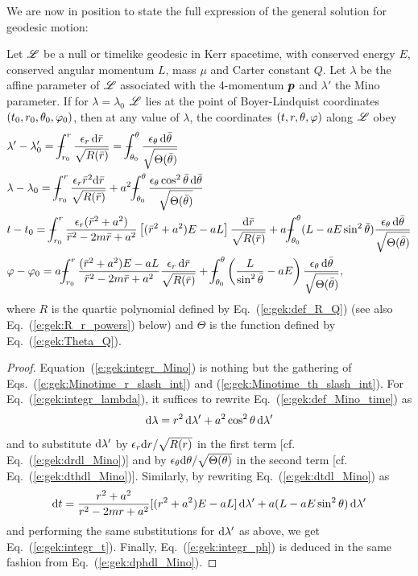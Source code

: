 We are now in position to state the full expression of the general
solution for geodesic motion:
\begin{greybox}
Let $\mathscr{L}$ be a null or timelike geodesic in Kerr spacetime,
with conserved energy $E$, conserved angular momentum $L$, mass $\mu$ and
Carter constant $Q$. Let $\lambda$ be the affine parameter of $\mathscr{L}$
associated with the 4-momentum $\bm{p}$ and $\lambda'$ the
Mino parameter. If for $\lambda=\lambda_0$
$\mathscr{L}$ lies at the point of Boyer-Lindquist coordinates $(t_0,r_0,\theta_0,\varphi_0)$,
then at any value of $\lambda$, the coordinates $(t,r,\theta,\varphi)$ along $\mathscr{L}$
obey
\begin{subequations}
\label{e:gek:integrated_eqs}
\begin{align}
 & \lambda' - \lambda'_0 = \dashint_{r_0}^r \frac{\eps_r \, \D \bar{r}}{\sqrt{R(\bar{r})}}
   = \dashint_{\th_0}^\th \frac{\eps_\th \, \D \bar{\th}}{\sqrt{\Theta(\bar{\th})}}
    \label{e:gek:integr_Mino}\\
 & \lambda - \lambda_0 = \dashint_{r_0}^r \frac{\eps_r \bar{r}^2 \D \bar{r}}{\sqrt{R(\bar{r})}}
    + a^2 \dashint_{\th_0}^\th \frac{\eps_\th \cos^2\bar{\th} \, \D \bar{\th}}{\sqrt{\Theta(\bar{\th})}}
    \label{e:gek:integr_lambda} \\
 & t - t_0 = \dashint_{r_0}^r  \frac{\eps_r (\bar{r}^2 + a^2)}{\bar{r}^2 - 2m \bar{r} + a^2}
 \left[ (\bar{r}^2 + a^2) E - a L \right] \frac{\D \bar{r}}{\sqrt{R(\bar{r})}}
 + a \dashint_{\th_0}^\th ( L - a E \sin^2\bar{\th} ) \frac{\eps_\th \, \D \bar{\th}}{\sqrt{\Theta(\bar{\th})}} \label{e:gek:integr_t} \\
 & \ph - \ph_0 = a \dashint_{r_0}^r  \frac{(\bar{r}^2 + a^2)E - a L}{\bar{r}^2 - 2m \bar{r} + a^2}
    \frac{\eps_r \, \D \bar{r}}{\sqrt{R(\bar{r})}}
    + \dashint_{\th_0}^\th \left( \frac{L}{\sin^2\bar{\th}} - a E  \right) \frac{\eps_\th \, \D \bar{\th}}{\sqrt{\Theta(\bar{\th})}} , \label{e:gek:integr_ph}
\end{align}
\end{subequations}
where $R$ is the quartic polynomial defined by Eq.~(\ref{e:gek:def_R_Q}) (see also Eq.~(\ref{e:gek:R_r_powers}) below) and $\Theta$ is the function defined by Eq.~(\ref{e:gek:Theta_Q}).
\end{greybox}
\begin{proof}
Equation~(\ref{e:gek:integr_Mino}) is nothing but the gathering of
Eqs.~(\ref{e:gek:Minotime_r_slash_int}) and (\ref{e:gek:Minotime_th_slash_int}).
For Eq.~(\ref{e:gek:integr_lambda}), it suffices to rewrite Eq.~(\ref{e:gek:def_Mino_time})
as
\[
    \mathrm{d}\lambda = r^2 \, \mathrm{d}\lambda' + a^2\cos^2\theta \, \mathrm{d}\lambda'
\]
and to substitute $\mathrm{d}\lambda'$ by $\epsilon_r \mathrm{d} r / \sqrt{R(r)}$
in the first term [cf. Eq.~(\ref{e:gek:drdl_Mino})] and by
$\epsilon_\theta \mathrm{d}\theta / \sqrt{\Theta(\theta)}$ in the second term [cf. Eq.~(\ref{e:gek:dthdl_Mino})].
Similarly, by rewriting Eq.~(\ref{e:gek:dtdl_Mino}) as
\[
    \mathrm{d} t = \frac{r^2 + a^2}{r^2 - 2mr + a^2} [(r^2 + a^2) E - a L] \, \mathrm{d}\lambda'
        + a ( L - a E \sin^2\theta ) \, \mathrm{d}\lambda'
\]
and performing the same substitutions for $\mathrm{d}\lambda'$ as above, we get
Eq.~(\ref{e:gek:integr_t}). Finally, Eq.~(\ref{e:gek:integr_ph}) is deduced
in the same fashion from Eq.~(\ref{e:gek:dphdl_Mino}).
\end{proof}


